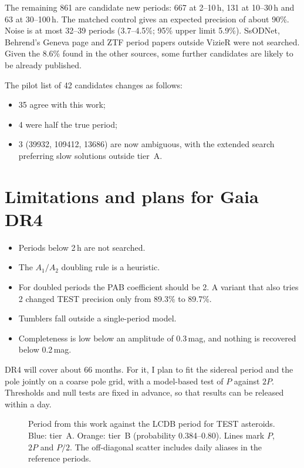 \documentclass[twocolumn]{aastex631}
\begin{document}
The remaining 861 are candidate new periods: 667 at 2--10\,h, 131 at 10--30\,h and 63 at 30--100\,h. The
matched control gives an expected precision of about 90\%. Noise is at most 32--39 periods (3.7--4.5\%; 95\% upper limit 5.9\%). SsODNet, Behrend's Geneva page and
ZTF period papers outside VizieR were not searched. Given the 8.6\% found in the other sources, some
further candidates are likely to be already published.

The pilot list of 42 candidates \citep{Tropynin2026a} changes as follows:
\begin{itemize}
\item 35 agree with this work;
\item 4 were half the true period;
\item 3 (39932, 109412, 13686) are now ambiguous, with the extended search preferring slow solutions
outside tier~A.
\end{itemize}

\section{Limitations and plans for Gaia DR4}

\begin{itemize}
\item Periods below 2\,h are not searched.
\item The $A_1/A_2$ doubling rule is a heuristic.
\item For doubled periods the PAB coefficient should be 2. A variant that also tries 2 changed TEST precision
only from 89.3\% to 89.7\%.
\item Tumblers fall outside a single-period model.
\item Completeness is low below an amplitude of 0.3\,mag, and nothing is recovered below 0.2\,mag.
\end{itemize}

DR4 will cover about 66 months. For it, I plan to fit the sidereal period and the pole jointly on a coarse
pole grid, with a model-based test of $P$ against $2P$. Thresholds and null tests are fixed in advance, so
that results can be released within a day.

\begin{figure}
\caption{Period from this work against the LCDB period for TEST asteroids. Blue: tier~A. Orange: tier~B
(probability 0.384--0.80). Lines mark $P$, $2P$ and $P/2$. The off-diagonal scatter includes daily aliases
in the reference periods.\label{fig:lcdb}}
\end{figure}
\end{document}
